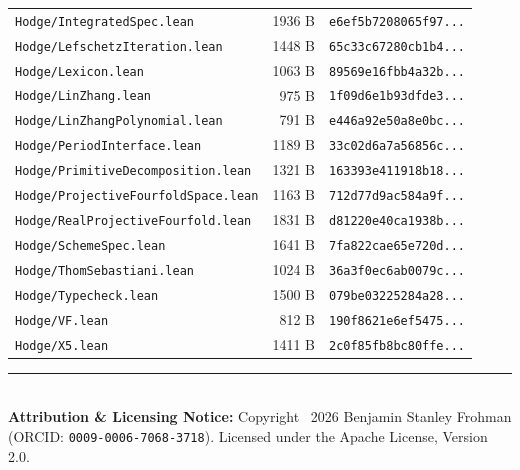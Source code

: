 \documentclass[11pt,a4paper]{article}
\begin{document}
\begin{center}
\begin{tabular}{p{}rr}
\texttt{Hodge/IntegratedSpec.lean} & 1936 B & \texttt{e6ef5b7208065f97...} \\
\texttt{Hodge/LefschetzIteration.lean} & 1448 B & \texttt{65c33c67280cb1b4...} \\
\texttt{Hodge/Lexicon.lean} & 1063 B & \texttt{89569e16fbb4a32b...} \\
\texttt{Hodge/LinZhang.lean} & 975 B & \texttt{1f09d6e1b93dfde3...} \\
\texttt{Hodge/LinZhangPolynomial.lean} & 791 B & \texttt{e446a92e50a8e0bc...} \\
\texttt{Hodge/PeriodInterface.lean} & 1189 B & \texttt{33c02d6a7a56856c...} \\
\texttt{Hodge/PrimitiveDecomposition.lean} & 1321 B & \texttt{163393e411918b18...} \\
\texttt{Hodge/ProjectiveFourfoldSpace.lean} & 1163 B & \texttt{712d77d9ac584a9f...} \\
\texttt{Hodge/RealProjectiveFourfold.lean} & 1831 B & \texttt{d81220e40ca1938b...} \\
\texttt{Hodge/SchemeSpec.lean} & 1641 B & \texttt{7fa822cae65e720d...} \\
\texttt{Hodge/ThomSebastiani.lean} & 1024 B & \texttt{36a3f0ec6ab0079c...} \\
\texttt{Hodge/Typecheck.lean} & 1500 B & \texttt{079be03225284a28...} \\
\texttt{Hodge/VF.lean} & 812 B & \texttt{190f8621e6ef5475...} \\
\texttt{Hodge/X5.lean} & 1411 B & \texttt{2c0f85fb8bc80ffe...} \\
\bottomrule
\end{tabular}
\end{center}

\vfill
\noindent\rule{\textwidth}{0.4pt}\\
\footnotesize
\textbf{Attribution \& Licensing Notice:} Copyright \textcopyright\ 2026 Benjamin Stanley Frohman (ORCID: \texttt{0009-0006-7068-3718}).
Licensed under the Apache License, Version 2.0.
\end{document}
